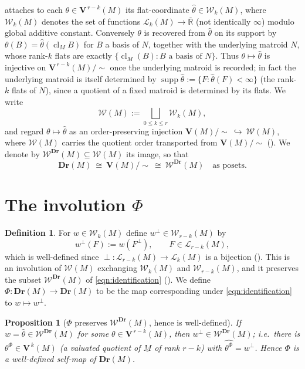 \documentclass{article}
\newtheorem{proposition}[theorem]{Proposition}
\theoremstyle{definition}
\newtheorem{definition}[theorem]{Definition}
\newcommand{\Rbar}{\overline{\mathbb{R}}}
\newcommand{\cl}{\operatorname{cl}}
\newcommand{\into}{\hookrightarrow}
\newcommand{\Dr}{\mathbf{Dr}}
\newcommand{\bV}{\mathbf V}
\newcommand{\cLL}{\mathcal{L}}
\newcommand{\cW}{\mathcal{W}}
\begin{document}
 attaches to each $\theta\in\bV^{\,r-k}(M)$ its flat-coordinate
$\widehat\theta\in\cW_k(M)$, where $\cW_k(M)$ denotes the set of functions
$\cLL_k(M)\to\Rbar$ (not identically $\infty$) modulo global additive constant. Conversely $\theta$
is recovered from $\widehat\theta$ on its support by
$\theta(B)=\widehat\theta(\cl_M B)$ for $B$ a basis of $N$, together with the underlying matroid
$N$, whose rank-$k$ flats are exactly $\{\cl_M(B):B\text{ a basis of }N\}$. Thus
$\theta\mapsto\widehat\theta$ is injective on $\bV^{\,r-k}(M)/\!\sim$ once the underlying matroid is
recorded; in fact the underlying matroid is itself determined by $\operatorname{supp}\widehat\theta
:=\{F:\widehat\theta(F)<\infty\}$ (the rank-$k$ flats of $N$), since a quotient of a fixed matroid
is determined by its flats. We write
\[
  \cW(M):=\bigsqcup_{0\le k\le r}\cW_k(M),
\]
and regard $\theta\mapsto\widehat\theta$ as an order-preserving injection
$\bV(M)/\!\sim\ \into\ \cW(M)$, where $\cW(M)$ carries the quotient order transported from
$\bV(M)/\!\sim$ (). We denote by $\cW^{\Dr}(M)\subseteq\cW(M)$ its image, so that
\begin{equation}\label{eqn:identification}
  \Dr(M)\ \cong\ \bV(M)/\!\sim\ \cong\ \cW^{\Dr}(M)\quad\text{as posets.}
\end{equation}

\section{The involution \texorpdfstring{$\Phi$}{Phi}}

\begin{definition}\label{def:Phi}
For $w\in\cW_k(M)$ define $w^{\perp}\in\cW_{r-k}(M)$ by
\begin{equation}\label{eqn:Phi-flat}
  w^{\perp}(F):=w(F^{\perp}),\qquad F\in\cLL_{r-k}(M),
\end{equation}
which is well-defined since $\perp\colon\cLL_{r-k}(M)\to\cLL_k(M)$ is a bijection ().
This is an involution of $\cW(M)$ exchanging $\cW_k(M)$ and $\cW_{r-k}(M)$, and it preserves the
subset $\cW^{\Dr}(M)$ of \eqref{eqn:identification} (). We define
$\Phi\colon\Dr(M)\to\Dr(M)$ to be the map corresponding under \eqref{eqn:identification} to
$w\mapsto w^{\perp}$.
\end{definition}

\begin{proposition}[$\Phi$ preserves $\cW^{\Dr}(M)$, hence is well-defined]\label{prop:wd}
If $w=\widehat\theta\in\cW^{\Dr}(M)$ for some $\theta\in\bV^{\,r-k}(M)$, then $w^{\perp}\in
\cW^{\Dr}(M)$; i.e.\ there is $\theta^{\Phi}\in\bV^{\,k}(M)$ (a valuated quotient of $\underline M$
of rank $r-k$) with $\widehat{\theta^{\Phi}}=w^{\perp}$. Hence $\Phi$ is a well-defined self-map of
$\Dr(M)$.
\end{proposition}
\end{document}
